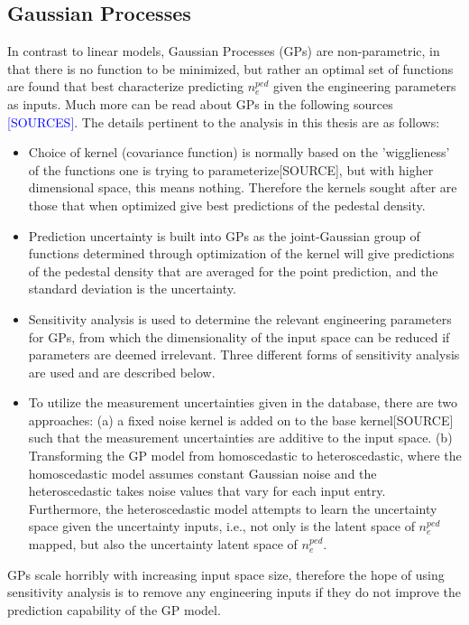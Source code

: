 \documentclass[a4paper, twoside, final, 12pt]{article}
\begin{document}
\subsection{Gaussian Processes}
In contrast to linear models, Gaussian Processes (GPs) are non-parametric, in that there is no function to be minimized, but rather an optimal set of functions are found that best characterize predicting $n_e^{ped}$ given the engineering parameters as inputs.
Much more can be read about GPs in the following sources \textcolor{blue}{[SOURCES]}.
The details pertinent to the analysis in this thesis are as follows:
\begin{itemize}
	\item Choice of kernel (covariance function) is normally based on the 'wigglieness' of the functions one is trying to parameterize[SOURCE], but with higher dimensional space, this means nothing. Therefore the kernels sought after are those that when optimized give best predictions of the pedestal density.
	\item Prediction uncertainty is built into GPs as the joint-Gaussian group of functions determined through optimization of the kernel will give predictions of the pedestal density that are averaged for the point prediction, and the standard deviation is the uncertainty. 
	\item Sensitivity analysis is used to determine the relevant engineering parameters for GPs, from which the dimensionality of the input space can be reduced if parameters are deemed irrelevant. Three different forms of sensitivity analysis are used and are described below. 
	\item To utilize the measurement uncertainties given in the database, there are two approaches: (a) a fixed noise kernel is added on to the base kernel[SOURCE] such that the measurement uncertainties are additive to the input space. (b) Transforming the GP model from homoscedastic to heteroscedastic, where the homoscedastic model assumes constant Gaussian noise and the heteroscedastic takes noise values that vary for each input entry. Furthermore, the heteroscedastic model attempts to learn the uncertainty space given the uncertainty inputs, i.e., not only is the latent space of $n_e^{ped}$ mapped, but also the uncertainty latent space of $n_e^{ped}$.   
\end{itemize}

GPs scale horribly with increasing input space size, therefore the hope of using sensitivity analysis is to remove any engineering inputs if they do not improve the prediction capability of the GP model.
\end{document}
